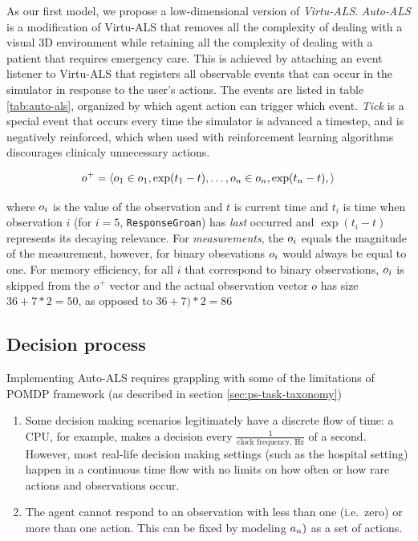 As our first model, we propose a low-dimensional version of \emph{Virtu-ALS}.
\emph{Auto-ALS} is a modification of Virtu-ALS that removes all the complexity of dealing with a visual 3D environment while retaining all the complexity of dealing with a patient that requires emergency care.
This is achieved by attaching an event listener to Virtu-ALS that registers all observable events that can occur in the simulator in response to the user's actions.
The events are listed in table \ref{tab:auto-als}, organized by which agent action can trigger which event.
\emph{Tick} is a special event that occurs every time the simulator is advanced a timestep, and is negatively reinforced, which when used with reinforcement learning algorithms discourages clinicaly unnecessary actions.

\begin{equation}
     o^{+} = \langle o_1 \in o_1, \exp(t_1-t), \dots, o_n \in o_n, \exp(t_n-t), \rangle
\end{equation}

where $o_i$ is the value of the observation and $t$ is current time and $t_i$ is time when observation $i$ (for $i=5$, \verb|ResponseGroan|) has \emph{last} occurred and $\exp(t_i-t)$ represents its decaying relevance.
For \emph{measurements}, the $o_i$ equals the magnitude of the measurement, however, for binary obsevations $o_i$ would always be equal to one.
For memory efficiency, for all $i$ that correspond to binary observations, $o_i$ is skipped from the $o^{+} $ vector and the actual observation vector $o$ has size $36+7*2=50$, as opposed to $36+7)*2=86$

\newpage
\subsection{Decision process}
\label{sec:mpdp}

Implementing Auto-ALS requires grappling with some of the limitations of POMDP framework (as described in section \ref{sec:ps-task-taxonomy})
\begin{enumerate}
    \item Some decision making scenarios legitimately have a discrete flow of time: a CPU, for example, makes a decision every $\frac{1}{\text{clock frequency, Hz}}$ of a second. However, most real-life decision making settings (such as the hospital setting) happen in a continuous time flow with no limits on how often or how rare actions and observations occur.
    \item The agent cannot respond to an observation with less than one (i.e.~zero) or more than one action. This can be fixed by modeling $a_n)$ as a set of actions.
\end{enumerate}

